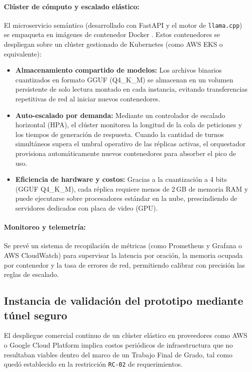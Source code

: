 \paragraph{Clúster de cómputo y escalado elástico:}
El microservicio semántico (desarrollado con FastAPI y el motor de \texttt{llama.cpp}) se empaqueta en imágenes de contenedor Docker \parencite{gerganov2023llamacpp, tiangolo2018fastapi}. Estos contenedores se despliegan sobre un clúster gestionado de Kubernetes (como AWS EKS o equivalente):
\begin{itemize}
    \item \textbf{Almacenamiento compartido de modelos:} Los archivos binarios cuantizados en formato GGUF (Q4\_K\_M) se almacenan en un volumen persistente de solo lectura montado en cada instancia, evitando transferencias repetitivas de red al iniciar nuevos contenedores.
    \item \textbf{Auto-escalado por demanda:} Mediante un controlador de escalado horizontal (HPA), el clúster monitorea la longitud de la cola de peticiones y los tiempos de generación de respuesta. Cuando la cantidad de turnos simultáneos supera el umbral operativo de las réplicas activas, el orquestador provisiona automáticamente nuevos contenedores para absorber el pico de uso.
    \item \textbf{Eficiencia de hardware y costos:} Gracias a la cuantización a 4 bits (GGUF Q4\_K\_M), cada réplica requiere menos de 2\,GB de memoria RAM y puede ejecutarse sobre procesadores estándar en la nube, prescindiendo de servidores dedicados con placa de video (GPU).
\end{itemize}

\paragraph{Monitoreo y telemetría:}
Se prevé un sistema de recopilación de métricas (como Prometheus y Grafana o AWS CloudWatch) para supervisar la latencia por oración, la memoria ocupada por contenedor y la tasa de errores de red, permitiendo calibrar con precisión las reglas de escalado.

\subsection{Instancia de validación del prototipo mediante túnel seguro}

El despliegue comercial continuo de un clúster elástico en proveedores como AWS o Google Cloud Platform implica costos periódicos de infraestructura que no resultaban viables dentro del marco de un Trabajo Final de Grado, tal como quedó establecido en la restricción \texttt{RC-02} de requerimientos.

